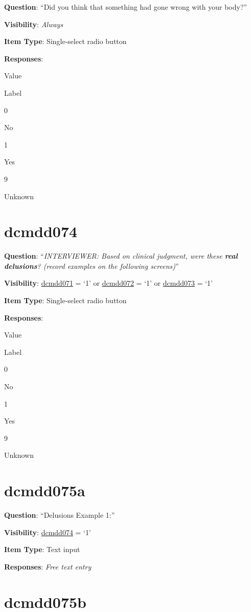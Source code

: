 \documentclass[]{book}
\begin{document}
\textbf{Question}: ``Did you think that something had gone wrong with your body?''

\textbf{Visibility}: \emph{Always}

\textbf{Item Type}: Single-select radio button

\textbf{Responses}:

Value

Label

0

No

1

Yes

9

Unknown

\hypertarget{dcmdd074}{%
\section{dcmdd074}\label{dcmdd074}}

\textbf{Question}: ``\emph{INTERVIEWER: Based on clinical judgment, were these \textbf{real delusions}? (record examples on the following screens)}''

\textbf{Visibility}: \protect\hyperlink{dcmdd071}{dcmdd071} = `1' or \protect\hyperlink{dcmdd072}{dcmdd072} = `1' or \protect\hyperlink{dcmdd073}{dcmdd073} = `1'

\textbf{Item Type}: Single-select radio button

\textbf{Responses}:

Value

Label

0

No

1

Yes

9

Unknown

\hypertarget{dcmdd075a}{%
\section{dcmdd075a}\label{dcmdd075a}}

\textbf{Question}: ``Delusions Example 1:''

\textbf{Visibility}: \protect\hyperlink{dcmdd074}{dcmdd074} = `1'

\textbf{Item Type}: Text input

\textbf{Responses}: \emph{Free text entry}

\hypertarget{dcmdd075b}{%
\section{dcmdd075b}\label{dcmdd075b}}
\end{document}
